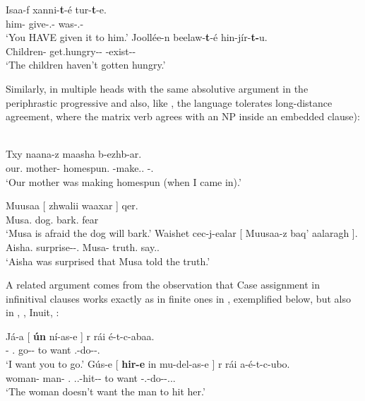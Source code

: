 \documentclass[output=paper]{langsci/langscibook}
\begin{document}
\ea%
    \label{ex:key:13.15} \parencite[99]{Baker2015}
	\ea
	\gll  Isaa-f xanni-\textbf{t}-é  tur-\textbf{t}-e.\\
	    him-\Dat{}  give-\Tsg.\Sbj{}-\Pst{}  was-\Tsg.\Sbj{}-\Pst{}\\
	\glt     ‘You HAVE given it to him.’
	\ex
	\gll  Joollée-n beelaw-\textbf{t}-é  hin-jír-\textbf{t-}u.\\
        Children-\Mnom{}  get.hungry-\glossF{}-\Pst{} \Neg{}-exist-\glossF{}-\Dep{}\\
	\glt     ‘The children haven’t gotten hungry.’
    \z
\z

Similarly, in  multiple heads  with the same
absolutive argument in the periphrastic progressive
\citep[71--72]{Baker2015} and also, like  \parencite{PolPot2001}, the
language tolerates long-distance agreement, where the matrix verb agrees with an NP inside an embedded clause):

\ea%
    \label{ex:key:13.16} \citep[263]{Nichols2011}\\
    \gll  Txy naana-z maasha b-ezhb-ar.\\
            our.\Gen{}  mother-\Erg{}  homespun.\Bb{} \Bb{}-make.\Cvb.\Sim{} \Bb{}-\Prog.\Pst\\
    \glt  ‘Our mother was making homespun (when I came in).’
\z

\ea%
    \label{ex:key:13.17} \parencite[551, 550]{Nichols2011}
	\ea
	\gll  Muusaa  [ zhwalii waaxar ]  qer.\\
            Musa.\Abs{} {} dog.\Abs{}  bark.\Vn{} {} fear\\
	\glt     ‘Musa is afraid the dog will bark.’
	\ex
	\gll  Waishet cec-j-ealar  [ Muusaa-z baq’  aalaragh ].\\
            Aisha.\Abs{}  surprise-\Jj-\Lv{}.\Pst{} {}  Musa-\Erg{} truth.\Abs{}  say.\Vn{}.\Lat{} {}\\
	\glt     ‘Aisha was surprised that Musa told the truth.’
    \z
\z

A related argument comes from the observation that Case assignment in
infinitival clauses works exactly as in finite ones in ,
exemplified below, but also in , , 
Inuit, :

\ea%
    \label{ex:key:13.18} \parencite[44]{Baker2015}
	\ea
	\gll   Já-a  [ \textbf{ún}  ní-as-e ]                r rái é-t-c-abaa.\\
    \Fsg-\Erg{} {} \Ssg.\Abs{}  go-\Inf{}-\Obl{} {} to want \Tsg.\Obj{}-do-\Npst-\Fsg{}.\Prs{}\\
	\glt     ‘I want you to go.’
	\ex
	\gll  Gús-e  [ \textbf{hir-e}  in mu-del-as-e ]                                     r rái a-é-t-c-ubo.\\
    woman-\Erg{} {}  man-\Erg{}  \Tsg{}.\Abs{} \Third.\glossF{}.\Obj{}-hit-\Inf{}-\Obl{} {} to want \Neg{}-\Tsg.\Obj{}-do-\Npst{}-\Third.\glossF.\Sbj{}.\Prs{}\\
	\glt     ‘The woman doesn’t want the man to hit her.’
    \z
\z
\end{document}
